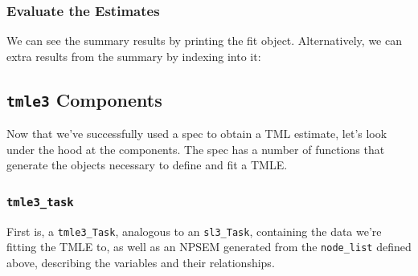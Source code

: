 \documentclass[12pt, krantz2,]{krantz}
\newenvironment{Shaded}{\begin{snugshade}}{\end{snugshade}}
\newcommand{\CommentTok}[1]{\textcolor[rgb]{0.37,0.37,0.37}{\textit{#1}}}
\newcommand{\KeywordTok}[1]{\textcolor[rgb]{0.27,0.27,0.27}{\textbf{#1}}}
\newcommand{\NormalTok}[1]{#1}
\newcommand{\OperatorTok}[1]{\textcolor[rgb]{0.43,0.43,0.43}{\textbf{#1}}}
\newcommand{\StringTok}[1]{\textcolor[rgb]{0.5,0.5,0.5}{#1}}
\theoremstyle{definition}
\theoremstyle{definition}
\theoremstyle{definition}
\newcommand{\1}{\mathbbm{1}}
\begin{document}
\hypertarget{evaluate-the-estimates}{%
\subsubsection{Evaluate the Estimates}\label{evaluate-the-estimates}}

We can see the summary results by printing the fit object. Alternatively, we
can extra results from the summary by indexing into it:

\begin{Shaded}
\end{Shaded}

\hypertarget{tmle3-components}{%
\subsection{\texorpdfstring{\texttt{tmle3} Components}{tmle3 Components}}\label{tmle3-components}}

Now that we've successfully used a spec to obtain a TML estimate, let's look
under the hood at the components. The spec has a number of functions that
generate the objects necessary to define and fit a TMLE.

\hypertarget{tmle3_task}{%
\subsubsection{\texorpdfstring{\texttt{tmle3\_task}}{tmle3\_task}}\label{tmle3_task}}

First is, a \texttt{tmle3\_Task}, analogous to an \texttt{sl3\_Task}, containing the data we're
fitting the TMLE to, as well as an NPSEM generated from the \texttt{node\_list}
defined above, describing the variables and their relationships.

\begin{Shaded}
\end{Shaded}
\end{document}

